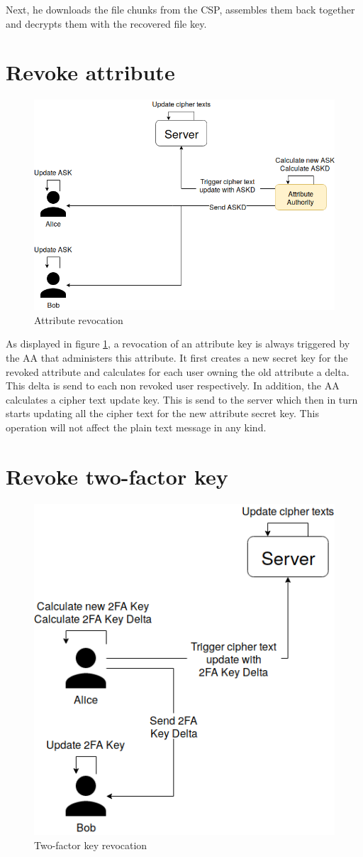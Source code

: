Next, he downloads the file chunks from the CSP, assembles them back together and decrypts them with the recovered file key.

\section{Revoke attribute}
\begin{figure}[!t]
\centering
    \includegraphics[width=0.7\linewidth]{img/TF-DAC-MACS-overview-revoce-attr.png}
    \caption{Attribute revocation}
    \label{fig:tfdacmacs-attr-revocation}
\end{figure}

As displayed in figure \ref{fig:tfdacmacs-attr-revocation}, a revocation of an attribute key is always triggered by the AA that administers this attribute. It first creates a new secret key for the revoked attribute and calculates for each user owning the old attribute a delta. This delta is send to each non revoked user respectively. In addition, the AA calculates a cipher text update key. This is send to the server which then in turn starts updating all the cipher text for the new attribute secret key. This operation will not affect the plain text message in any kind. 

\section{Revoke two-factor key}
\begin{figure}[!t]
\centering
    \includegraphics[width=0.6\linewidth]{img/TF-DAC-MACS-overview-revoce-user-key.png}
    \caption{Two-factor key revocation}
    \label{fig:tfdacmacs-user-auth-key-revocation}
\end{figure}

